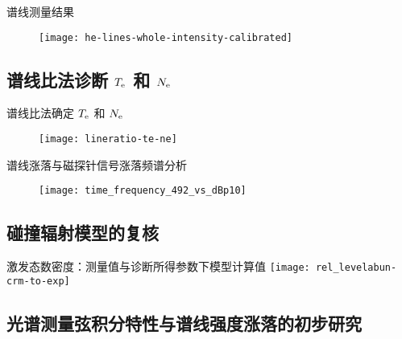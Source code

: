 \begin{CJK*}{UTF8}{kai}
\begin{frame}{谱线测量结果}
	\centering
  \begin{figure}
      \texttt{[image: he-lines-whole-intensity-calibrated]}
  \end{figure}
\end{frame}

\subsection{谱线比法诊断 $T_{\rm e}$ 和 $N_{\rm e}$}

\begin{frame}{谱线比法确定 $T_{\rm e}$ 和 $N_{\rm e}$}
	\vspace{-0.5em}
	\begin{figure}
      \texttt{[image: lineratio-te-ne]}
  \end{figure}
\end{frame}

\begin{frame}{谱线涨落与磁探针信号涨落频谱分析}
	\vspace{-0.5em}
	\begin{figure}
      \texttt{[image: time\_frequency\_492\_vs\_dBp10]}
  \end{figure}
\end{frame}

\subsection{碰撞辐射模型的复核}
\begin{frame}{激发态数密度：测量值与诊断所得参数下模型计算值}
	\centering
	\vspace{-0.5em}
    \texttt{[image: rel\_levelabun-crm-to-exp]}
\end{frame}

\subsection{光谱测量弦积分特性与谱线强度涨落的初步研究}



\end{CJK*}
